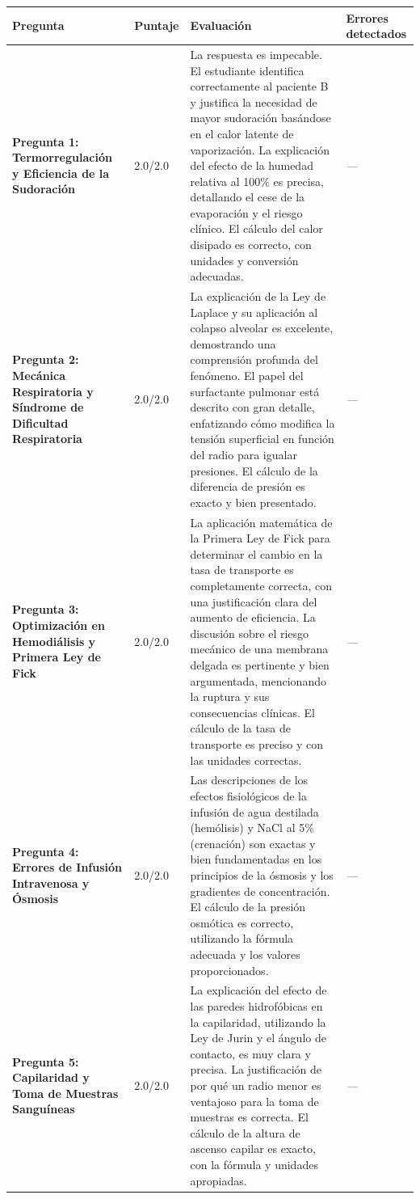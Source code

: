 \documentclass[11pt,a4paper]{article}
\begin{document}
\begin{longtable}{>{\bfseries}p{2.8cm} p{1.6cm} p{7.0cm} p{2.8cm}}
  \toprule
  \textbf{Pregunta} & \textbf{Puntaje} & \textbf{Evaluación} & \textbf{Errores detectados} \\
  \midrule
  \endhead
  \bottomrule
  \endfoot
    \textbf{Pregunta 1: Termorregulación y Eficiencia de la Sudoración} & 2.0/2.0 & La respuesta es impecable. El estudiante identifica correctamente al paciente B y justifica la necesidad de mayor sudoración basándose en el calor latente de vaporización. La explicación del efecto de la humedad relativa al 100\% es precisa, detallando el cese de la evaporación y el riesgo clínico. El cálculo del calor disipado es correcto, con unidades y conversión adecuadas. & \textit{---} \\
    \midrule
    \textbf{Pregunta 2: Mecánica Respiratoria y Síndrome de Dificultad Respiratoria} & 2.0/2.0 & La explicación de la Ley de Laplace y su aplicación al colapso alveolar es excelente, demostrando una comprensión profunda del fenómeno. El papel del surfactante pulmonar está descrito con gran detalle, enfatizando cómo modifica la tensión superficial en función del radio para igualar presiones. El cálculo de la diferencia de presión es exacto y bien presentado. & \textit{---} \\
    \midrule
    \textbf{Pregunta 3: Optimización en Hemodiálisis y Primera Ley de Fick} & 2.0/2.0 & La aplicación matemática de la Primera Ley de Fick para determinar el cambio en la tasa de transporte es completamente correcta, con una justificación clara del aumento de eficiencia. La discusión sobre el riesgo mecánico de una membrana delgada es pertinente y bien argumentada, mencionando la ruptura y sus consecuencias clínicas. El cálculo de la tasa de transporte es preciso y con las unidades correctas. & \textit{---} \\
    \midrule
    \textbf{Pregunta 4: Errores de Infusión Intravenosa y Ósmosis} & 2.0/2.0 & Las descripciones de los efectos fisiológicos de la infusión de agua destilada (hemólisis) y NaCl al 5\% (crenación) son exactas y bien fundamentadas en los principios de la ósmosis y los gradientes de concentración. El cálculo de la presión osmótica es correcto, utilizando la fórmula adecuada y los valores proporcionados. & \textit{---} \\
    \midrule
    \textbf{Pregunta 5: Capilaridad y Toma de Muestras Sanguíneas} & 2.0/2.0 & La explicación del efecto de las paredes hidrofóbicas en la capilaridad, utilizando la Ley de Jurin y el ángulo de contacto, es muy clara y precisa. La justificación de por qué un radio menor es ventajoso para la toma de muestras es correcta. El cálculo de la altura de ascenso capilar es exacto, con la fórmula y unidades apropiadas. & \textit{---} \\
    \midrule
\end{longtable}
\end{document}
